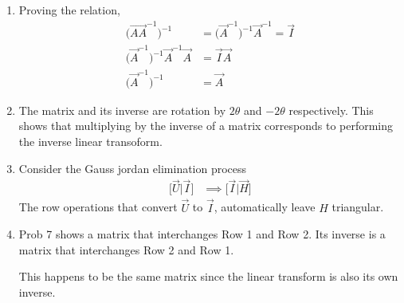 \begin{enumerate}
    \item Proving the relation,
          \begin{align}
              \big(\vec{AA}^{-1}\big)^{-1} & = \big(\vec{A}^{-1}\big)^{-1} \vec{A}^{-1}
              = \vec{I}                                                                 \\
              \big(\vec{A}^{-1}\big)^{-1}
              \vec{A}^{-1} \vec{A}         & = \vec{I} \vec{A}                          \\
              \big(\vec{A}^{-1}\big)^{-1}  & = \vec{A}
          \end{align}

    \item The matrix and its inverse are rotation by $ 2\theta $ and $ -2\theta $
          respectively. This shows that multiplying by the inverse of a matrix
          corresponds to performing the inverse linear transoform.

    \item Consider the Gauss jordan elimination process
          \begin{align}
              \Big[\vec{U} \big| \vec{I} \Big] &
              \implies \Big[\vec{I} \big| \vec{H} \Big]
          \end{align}
          The row operations that convert $ \vec{U} $ to $ \vec{I} $, automatically leave
          $ H $ triangular.

    \item Prob 7 shows a matrix that interchanges Row 1 and Row 2. Its inverse is a
          matrix that interchanges Row 2 and Row 1. \par
          This happens to be the same matrix since the linear transform is also its own
          inverse.


\end{enumerate}
